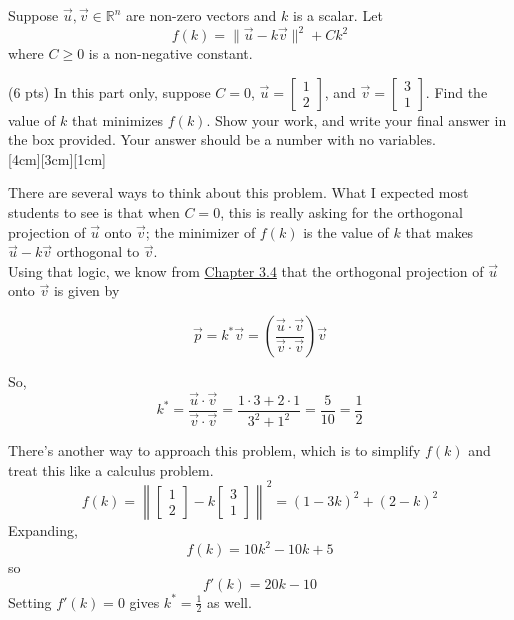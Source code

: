 \documentclass[11pt]{article}
\begin{document}
\newpage

\begin{prob}[(13 pts)]
Suppose $\vec u,\vec v\in\mathbb R^n$ are non-zero vectors and $k$ is a scalar. Let
$$f(k) = \lVert \vec u - k \vec v \rVert^2 + C k^2$$
where $C \geq 0$ is a non-negative constant.

\begin{subprob}(6 pts) In this part only, suppose $C=0$, $\vec u = \begin{bmatrix} 1 \\ 2 \end{bmatrix}$, and $\vec v = \begin{bmatrix} 3 \\ 1 \end{bmatrix}$. Find the value of $k$ that minimizes $f(k)$. Show your work, and write your final answer in the box provided. Your answer should be a number with no variables. \\

[4cm][3cm][1cm]

\begin{solution}
There are several ways to think about this problem. What I expected most students to see is that when $C = 0$, this is really asking for the orthogonal projection of $\vec u$ onto $\vec v$; the minimizer of $f(k)$ is the value of $k$ that makes $\vec u - k \vec v$ orthogonal to $\vec v$. \\

Using that logic, we know from \href{https://notes.eecs245.org/vectors/orthogonal-projection/}{Chapter 3.4} that the orthogonal projection of $\vec u$ onto $\vec v$ is given by

$$\vec p = k^* \vec v = \left( \frac{\vec u \cdot \vec v}{\vec v \cdot \vec v} \right) \vec v$$

So, $$k^* = \frac{\vec u \cdot \vec v}{\vec v \cdot \vec v} = \frac{1 \cdot 3 + 2 \cdot 1}{3^2 + 1^2} = \frac{5}{10} = \boxed{\frac{1}{2}}$$

There's another way to approach this problem, which is to simplify $f(k)$ and treat this like a calculus problem. 
\[
f(k)=\left\|\begin{bmatrix}1\\2\end{bmatrix}-k\begin{bmatrix}3\\1\end{bmatrix}\right\|^2=(1-3k)^2+(2-k)^2
\]
Expanding,
\[
f(k)=10k^2-10k+5
\]
so
\[
f'(k)=20k-10
\]
Setting $f'(k)=0$ gives $k^* = \frac{1}{2}$ as well.
\end{solution}
\end{subprob}


\end{prob}
\end{document}
